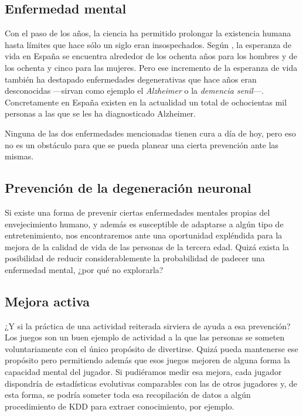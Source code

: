 \subsection{Enfermedad mental}

Con el paso de los años, la ciencia ha permitido prolongar la existencia humana hasta límites que hace sólo un siglo eran insospechados. Según \cite{ine-esperanza}, la esperanza de vida en España se encuentra alrededor de los ochenta años para los hombres y de los ochenta y cinco para las mujeres. Pero ese incremento de la esperanza de vida también ha destapado enfermedades degenerativas que hace años eran desconocidas ---sirvan como ejemplo el {\it Alzheimer} o la {\it demencia senil}---. Concretamente en España existen en la actualidad un total de ochocientas mil personas a las que se les ha diagnosticado Alzheimer.

Ninguna de las dos enfermedades mencionadas tienen cura a día de hoy, pero eso no es un obstáculo para que se pueda planear una cierta prevención ante las mismas.

\subsection{Prevención de la degeneración neuronal}

Si existe una forma de prevenir ciertas enfermedades mentales propias del envejecimiento humano, y además es susceptible de adaptarse a algún tipo de entretenimiento, nos encontraremos ante una oportunidad expléndida para la mejora de la calidad de vida de las personas de la tercera edad. Quizá exista la posibilidad de reducir considerablemente la probabilidad de padecer una enfermedad mental, ¿por qué no explorarla?

\subsection{Mejora activa}

¿Y si la práctica de una actividad reiterada sirviera de ayuda a esa prevención? Los juegos son un buen ejemplo de actividad a la que las personas se someten voluntariamente con el único propósito de divertirse. Quizá pueda mantenerse ese propósito pero permitiendo además que esos juegos mejoren de alguna forma la capacidad mental del jugador. Si pudiéramos medir esa mejora, cada jugador dispondría de estadísticas evolutivas comparables con las de otros jugadores y, de esta forma, se podría someter toda esa recopilación de datos a algún procedimiento de \acf{KDD} para extraer conocimiento, por ejemplo.

